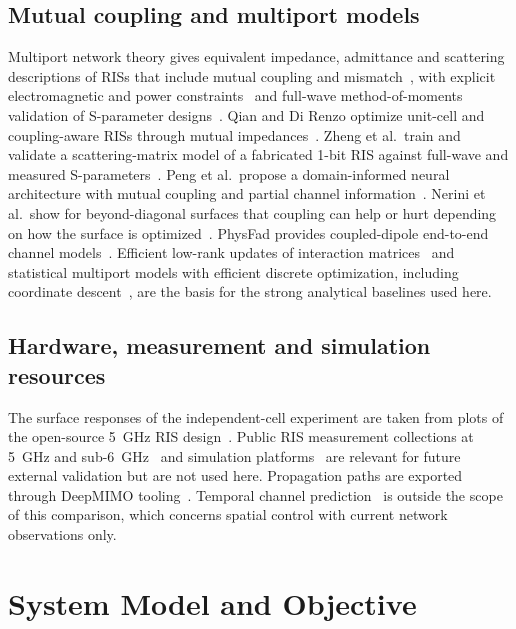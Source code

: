 \documentclass[conference]{IEEEtran}
\begin{document}
\subsection{Mutual coupling and multiport models}
Multiport network theory gives equivalent impedance, admittance and scattering descriptions of RISs that include mutual coupling and mismatch~\cite{nerini}, with explicit electromagnetic and power constraints~\cite{nossek} and full-wave method-of-moments validation of S-parameter designs~\cite{abrardo}. Qian and Di Renzo optimize unit-cell and coupling-aware RISs through mutual impedances~\cite{qian}. Zheng et al.\ train and validate a scattering-matrix model of a fabricated 1-bit RIS against full-wave and measured S-parameters~\cite{zheng}. Peng et al.\ propose a domain-informed neural architecture with mutual coupling and partial channel information~\cite{risnet}. Nerini et al.\ show for beyond-diagonal surfaces that coupling can help or hurt depending on how the surface is optimized~\cite{nerini2}. PhysFad provides coupled-dipole end-to-end channel models~\cite{physfad}. Efficient low-rank updates of interaction matrices~\cite{prodhomme} and statistical multiport models with efficient discrete optimization, including coordinate descent~\cite{hammami}, are the basis for the strong analytical baselines used here.

\subsection{Hardware, measurement and simulation resources}
The surface responses of the independent-cell experiment are taken from plots of the open-source 5~GHz RIS design~\cite{heinrichs}. Public RIS measurement collections at 5~GHz and sub-6~GHz~\cite{tewes,piana,rossanese} and simulation platforms~\cite{qris} are relevant for future external validation but are not used here. Propagation paths are exported through DeepMIMO tooling~\cite{deepmimo}. Temporal channel prediction~\cite{liu22} is outside the scope of this comparison, which concerns spatial control with current network observations only.

\section{System Model and Objective}\label{sec:system}
\end{document}
